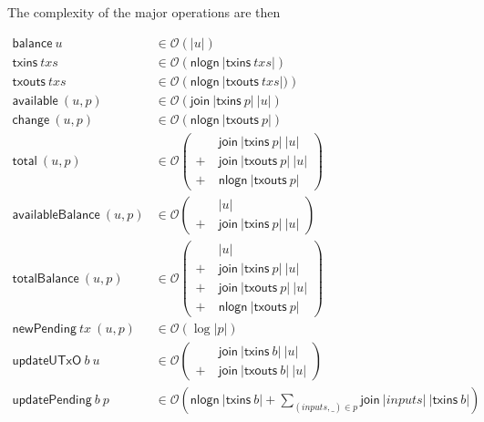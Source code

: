 \documentclass{article}
\newcommand{\order}[1]{\mathcal{O}\left(#1\right)}
\begin{document}
The complexity of the major operations are then

\begin{equation*}
\begin{split}
\mathsf{balance} ~ u & \in \order{|u|} \\
\mathsf{txins}   ~ txs  & \in \order{\mathsf{nlogn} ~ |\mathsf{txins}~ txs|} \\
\mathsf{txouts}  ~ txs  & \in \order{\mathsf{nlogn} ~ |\mathsf{txouts}~ txs|)} \\
\mathsf{available} ~ (u,p) & \in \order{\mathsf{join} ~ |\mathsf{txins}~ p| ~ |u|} \\
\mathsf{change}    ~ (u,p) & \in \order{\mathsf{nlogn} ~ |\mathsf{txouts}~ p| } \\
\mathsf{total}     ~ (u,p) & \in \order{
                              \begin{split}
                                & ~ \mathsf{join} ~ |\mathsf{txins}~ p| ~ |u| \\
                              + & ~ \mathsf{join} ~ |\mathsf{txouts}~ p| ~ |u| \\
                              + & ~ \mathsf{nlogn} ~ |\mathsf{txouts}~ p|
                              \end{split}} \\
\mathsf{availableBalance} ~ (u,p) & \in \order{
                              \begin{split}
                                & ~ |u| \\
                              + & ~ \mathsf{join} ~ |\mathsf{txins}~ p| ~ |u|
                              \end{split}} \\
\mathsf{totalBalance}     ~ (u,p) & \in \order{
                              \begin{split}
                                & ~ |u| \\
                              + & ~ \mathsf{join} ~ |\mathsf{txins}~ p| ~ |u| \\
                              + & ~ \mathsf{join} ~ |\mathsf{txouts}~ p| ~ |u| \\
                              + & ~ \mathsf{nlogn} ~ |\mathsf{txouts}~ p|
                              \end{split}} \\
\mathsf{newPending} ~ tx ~ (u,p) & \in \order{\log |p|} \\
\mathsf{updateUTxO} ~ b ~ u & \in \order{
                              \begin{split}
                                & ~ \mathsf{join} ~ |\mathsf{txins}~ b| ~ |u| \\
                              + & ~ \mathsf{join} ~ |\mathsf{txouts}~ b| ~ |u|
                              \end{split}} \\
\mathsf{updatePending} ~ b ~ p & \in \order{\mathsf{nlogn} ~ |\mathsf{txins}~ b| + \sum_{(inputs, \_) \in p}{\mathsf{join} ~ |inputs| ~ |\mathsf{txins}~ b|}}
\end{split}
\end{equation*}
\end{document}
